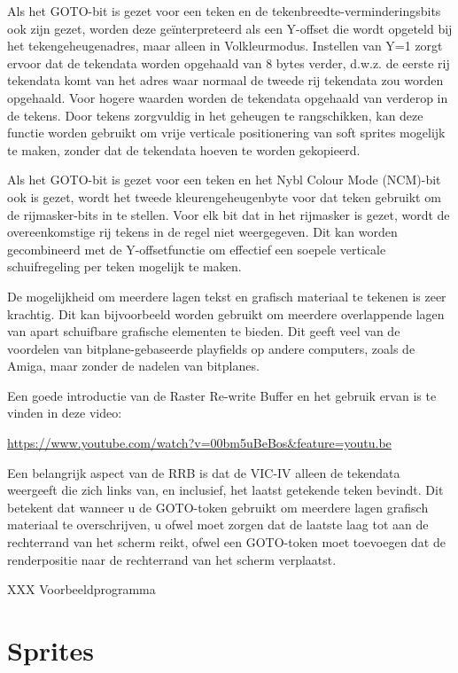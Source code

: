 Als het GOTO-bit is gezet voor een teken en de tekenbreedte-verminderingsbits ook zijn gezet, worden deze geïnterpreteerd als een Y-offset die wordt opgeteld bij het tekengeheugenadres, maar alleen in Volkleurmodus. Instellen van Y=1 zorgt ervoor dat de tekendata worden opgehaald van 8 bytes verder, d.w.z. de eerste rij tekendata komt van het adres waar normaal de tweede rij tekendata zou worden opgehaald. Voor hogere waarden worden de tekendata opgehaald van verderop in de tekens. Door tekens zorgvuldig in het geheugen te rangschikken, kan deze functie worden gebruikt om vrije verticale positionering van soft sprites mogelijk te maken, zonder dat de tekendata hoeven te worden gekopieerd.

Als het GOTO-bit is gezet voor een teken en het Nybl Colour Mode (NCM)-bit ook is gezet, wordt het tweede kleurengeheugenbyte voor dat teken gebruikt om de rijmasker-bits in te stellen. Voor elk bit dat in het rijmasker is gezet, wordt de overeenkomstige rij tekens in de regel niet weergegeven. Dit kan worden gecombineerd met de Y-offsetfunctie om effectief een soepele verticale schuifregeling per teken mogelijk te maken.

De mogelijkheid om meerdere lagen tekst en grafisch materiaal te tekenen is zeer krachtig. Dit kan bijvoorbeeld worden gebruikt om meerdere overlappende lagen van apart schuifbare grafische elementen te bieden. Dit geeft veel van de voordelen van bitplane-gebaseerde playfields op andere computers, zoals de Amiga, maar zonder de nadelen van bitplanes.

Een goede introductie van de Raster Re-write Buffer en het gebruik ervan is te vinden in deze video:

\url{https://www.youtube.com/watch?v=00bm5uBeBos&feature=youtu.be}

Een belangrijk aspect van de RRB is dat de VIC-IV alleen de tekendata weergeeft die zich links van, en inclusief, het laatst getekende teken bevindt. Dit betekent dat wanneer u de GOTO-token gebruikt om meerdere lagen grafisch materiaal te overschrijven, u ofwel moet zorgen dat de laatste laag tot aan de rechterrand van het scherm reikt, ofwel een GOTO-token moet toevoegen dat de renderpositie naar de rechterrand van het scherm verplaatst.


XXX Voorbeeldprogramma

\section{Sprites}

